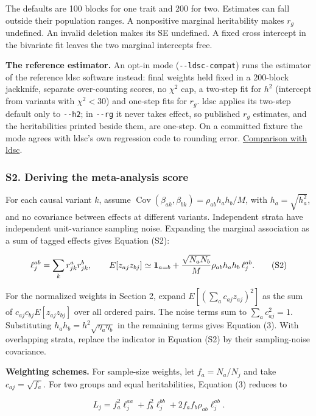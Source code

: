 \documentclass[11pt,a4paper]{article}
\begin{document}
The defaults are 100 blocks for one trait and 200 for two. Estimates can fall outside their population ranges. A nonpositive marginal heritability makes \(r_g\) undefined. An invalid deletion makes its SE undefined. A fixed cross intercept in the bivariate fit leaves the two marginal intercepts free.

\textbf{The reference estimator.} An opt-in mode (\texttt{-\/-ldsc-compat}) runs the estimator of the reference ldsc software instead: final weights held fixed in a 200-block jackknife, separate over-counting scores, no \(\chi^2\) cap, a two-step fit for \(h^2\) (intercept from variants with \(\chi^2<30\)) and one-step fits for \(r_g\). ldsc applies its two-step default only to \texttt{-\/-h2}; in \texttt{-\/-rg} it never takes effect, so published \(r_g\) estimates, and the heritabilities printed beside them, are one-step. On a committed fixture the mode agrees with ldsc's own regression code to rounding error. \href{../docs/LDSC.md\#ldsc-equivalence}{Comparison with ldsc}.

\subsubsection{S2. Deriving the meta-analysis score}\label{s2-deriving-the-meta-analysis-score}

For each causal variant \(k\), assume \(\operatorname{Cov}(\beta_{ak},\beta_{bk})=\rho_{ab}h_ah_b/M\), with \(h_a=\sqrt{h_a^2}\), and no covariance between effects at different variants. Independent strata have independent unit-variance sampling noise. Expanding the marginal association as a sum of tagged effects gives Equation (S2):

\[
\ell_j^{ab}=\sum_k r^a_{jk}r^b_{jk},\qquad
E[z_{aj}z_{bj}]\simeq {\bf 1}_{a=b}
+\frac{\sqrt{N_aN_b}}{M}\rho_{ab}h_a h_b\,\ell_j^{ab}. \tag{S2}
\]

For the normalized weights in Section 2, expand \(E[(\sum_ac_{aj}z_{aj})^2]\) as the sum of \(c_{aj}c_{bj}E[z_{aj}z_{bj}]\) over all ordered pairs. The noise terms sum to \(\sum_ac_{aj}^2=1\). Substituting \(h_ah_b=h^2\sqrt{\eta_a\eta_b}\) in the remaining terms gives Equation (3). With overlapping strata, replace the indicator in Equation (S2) by their sampling-noise covariance.

\textbf{Weighting schemes.} For sample-size weights, let \(f_a=N_a/N_j\) and take \(c_{aj}=\sqrt{f_a}\). For two groups and equal heritabilities, Equation (3) reduces to

\[
L_j=f_a^2\ell_j^{aa}+f_b^2\ell_j^{bb}
       +2f_af_b\rho_{ab}\ell_j^{ab}. \tag{S3}
\]
\end{document}
